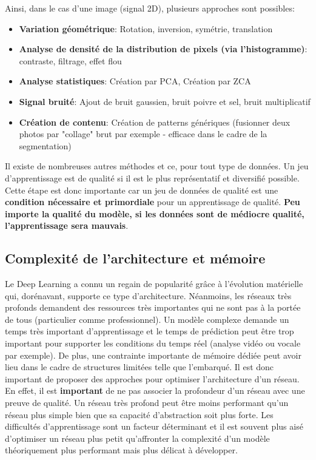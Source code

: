 \noindent Ainsi, dans le cas d'une image (signal 2D), plusieurs approches sont possibles:
\begin{itemize}
    \item \textbf{Variation géométrique}: Rotation, inversion, symétrie, translation
    \item \textbf{Analyse de densité de la distribution de pixels (via l'histogramme)}: contraste, filtrage, effet flou
    \item \textbf{Analyse statistiques}: Création par PCA, Création par ZCA
    \item \textbf{Signal bruité}: Ajout de bruit gaussien, bruit poivre et sel, bruit multiplicatif
    \item \textbf{Création de contenu}: Création de patterns génériques (fusionner deux photos par "collage" brut par exemple - efficace dans le cadre de la segmentation)
\end{itemize}

\noindent Il existe de nombreuses autres méthodes et ce, pour tout type de données. Un jeu d'apprentissage est de qualité si il est le plus représentatif et diversifié possible. Cette étape est donc importante car un jeu de données de qualité est une \textbf{condition nécessaire et primordiale} pour un apprentissage de qualité. \textbf{Peu importe la qualité du modèle, si les données sont de médiocre qualité, l'apprentissage sera mauvais}.

\subsection{Complexité de l'architecture et mémoire}
\label{deepcompsec}
Le Deep Learning a connu un regain de popularité grâce à l'évolution matérielle qui, dorénavant, supporte ce type d'architecture. Néanmoins, les réseaux très profonds demandent des ressources très importantes qui ne sont pas à la portée de tous (particulier comme professionnel). Un modèle complexe demande un temps très important d'apprentissage et le temps de prédiction peut être trop important pour supporter les conditions du temps réel (analyse vidéo ou vocale par exemple). De plus, une contrainte importante de mémoire dédiée peut avoir lieu dans le cadre de structures limitées telle que l'embarqué. Il est donc important de proposer des approches pour optimiser l'architecture d'un réseau. En effet, il est \textbf{important} de ne pas associer la profondeur d'un réseau avec une preuve de qualité. Un réseau très profond peut être moins performant qu'un réseau plus simple bien que sa capacité d'abstraction soit plus forte. Les difficultés d'apprentissage sont un facteur déterminant et il est souvent plus aisé d'optimiser un réseau plus petit qu'affronter la complexité d'un modèle théoriquement plus performant mais plus délicat à développer.\\

